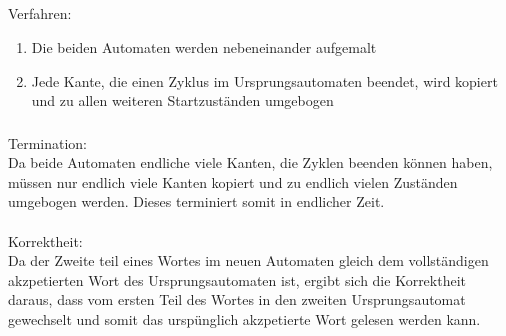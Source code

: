 \documentclass[a4paper,12pt]{scrartcl}
\begin{document}
\subsection{}
\subsubsection{}
Verfahren:
\begin{enumerate}
\item Die beiden Automaten werden nebeneinander aufgemalt
\item Jede Kante, die einen Zyklus im Ursprungsautomaten beendet, wird kopiert 
und zu allen weiteren Startzuständen umgebogen
\end{enumerate}
\subsubsection{}
Termination:\\
Da beide Automaten endliche viele Kanten, die Zyklen beenden können haben, 
müssen nur endlich viele Kanten kopiert und zu endlich vielen Zuständen 
umgebogen werden. Dieses terminiert somit in endlicher Zeit.
\\\\
Korrektheit:\\
Da der Zweite teil eines Wortes im neuen Automaten gleich dem vollständigen akzpetierten Wort des Ursprungsautomaten ist, ergibt sich die Korrektheit daraus, dass vom ersten Teil des Wortes in den zweiten Ursprungsautomat gewechselt und somit das urspünglich akzpetierte Wort gelesen werden kann.  
\end{document}
